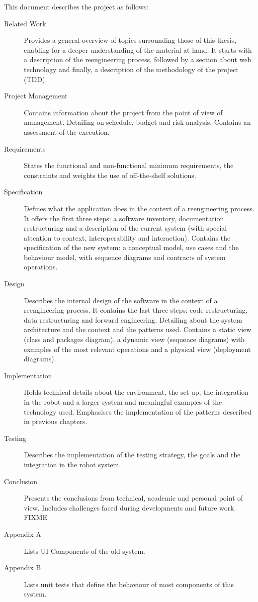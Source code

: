 This document describes the project as follows:
\begin{description}
\item[Related Work] Provides a general overview of topics surrounding those of this thesis, enabling for a deeper understanding of the material at hand.
It starts with a description of the reengineering process, followed by a section about web technology and finally, a description of the methodology of the project (\ac{TDD}).

\item[Project Management] Contains information about the project from the point of view of management. 
Detailing on schedule, budget and risk analysis. Contains an assessment of the execution.

\item[Requirements] States the functional and non-functional minimum requirements, the constraints and weights the use of off-the-shelf solutions.

\item[Specification] Defines what the application does in the context of a reengineering process. 
It offers the first three steps: a software inventory, documentation restructuring and a description of the current system (with special attention to context, interoperability and interaction).
Contains the specification of the new system: a conceptual model, use cases and the behaviour model, with sequence diagrams and contracts of system operations. 

\item[Design] Describes the internal design of the software in the context of a reengineering process. 
It contains the last three steps: code restructuring, data restructuring and forward engineering.
Detailing about the system architecture and the context and the patterns used.
Contains a static view (class and packages diagram), a dynamic view (sequence diagrams) with examples of the most relevant operations and a physical view (deployment diagrams).

\item[Implementation] Holds technical details about the environment, the set-up, the integration in the robot and a larger system and meaningful examples of the technology used. 
Emphasises the implementation of the patterns described in previous chapters.

\item[Testing] Describes the implementation of the testing strategy, the goals and the integration in the robot system.

\item[Conclusion] Presents the conclusions from technical, academic and personal point of view. 
Includes challenges faced during developments and future work. FIXME

\item[Appendix A] Lists UI Components of the old system.

\item[Appendix B] Lists unit tests that define the behaviour of most components of this system.

\end{description}